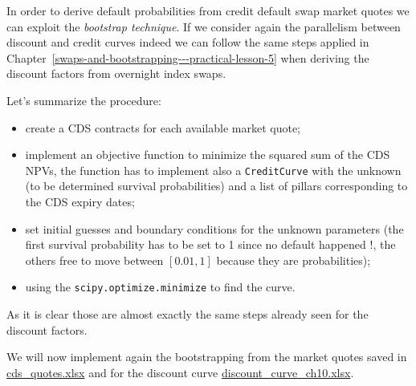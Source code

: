 In order to derive default probabilities from credit default swap market quotes we can exploit the \emph{bootstrap technique}. If we consider again the parallelism between discount and credit curves indeed we can follow the same steps applied in Chapter~\ref{swaps-and-bootstrapping---practical-lesson-5} when deriving the discount factors from overnight index swaps.

Let's summarize the procedure: 
\begin{itemize}
\tightlist
\item create a CDS contracts for each available market quote;
\item implement an objective function to minimize the squared sum of the CDS
	NPVs, the function has to implement also a \texttt{CreditCurve} with
	the unknown (to be determined survival probabilities) and a list of pillars corresponding to the CDS expiry dates;
\item set initial guesses and boundary conditions for the
	unknown parameters (the first survival probability has to be set to 1
	since no default happened !, the others free to move between $[0.01, 1]$ because they are probabilities);
\item using the \texttt{scipy.optimize.minimize} to find the curve.
\end{itemize}

As it is clear those are almost exactly the same steps already seen for the discount factors.

We will now implement again the bootstrapping from the market quotes saved in \href{https://drive.google.com/file/d/1BOtwCFYk0CUwYkMhnowWTj0HNOpBefd_/view?usp=sharing}{cds\_quotes.xlsx} and for the discount curve \href{https://drive.google.com/file/d/1mugHyet3H9tcSAvYvt8G4_kpfaEbVY7b/view?usp=sharing}{discount\_curve\_ch10.xlsx}.

